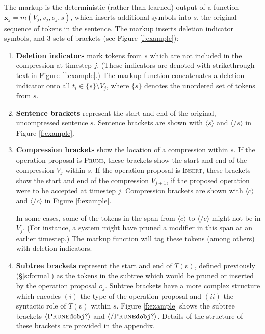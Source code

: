 \documentclass[11pt,a4paper]{article}
\begin{document}
The markup is the deterministic (rather than learned) output of a function $\bm{x}_j=m(V_j,v_j,o_j,s)$, which inserts additional symbols into $s$, the original sequence of tokens in the sentence. The markup inserts deletion indicator symbols, and 3 sets of brackets (see Figure \ref{f:example}): 

\begin{enumerate}
\item{\textbf{Deletion indicators} mark tokens from $s$ which are not included in the compression at timestep $j$. (These indicators are denoted with strikethrough text in Figure \ref{f:example}.) The markup function concatenates a deletion indicator onto all $t_i \in \{s\} \setminus V_j$, where $\{s\}$ denotes the unordered set of tokens from $s$.} 
\item{\textbf{Sentence brackets} represent the start and end of the original, uncompressed sentence $s$. Sentence brackets are shown with $\langle s \rangle$ and $\langle / s \rangle$ in Figure \ref{f:example}.}
\item{\textbf{Compression brackets} show the location of a compression within $s$. If the operation proposal is \textsc{Prune}, these brackets show the start and end of the compression $V_j$ within $s$. If the operation proposal is \textsc{Insert}, these brackets show the start and end of the compression $V_{j+1}$, if the proposed operation were to be accepted at timestep $j$. Compression brackets are shown with $\langle c \rangle$ and $\langle / c \rangle$ in Figure \ref{f:example}. 

In some cases, some of the tokens in the span from $\langle c \rangle$ to $\langle /c \rangle$ might not be in $V_j$. (For instance, a system might have pruned a modifier in this span at an earlier timestep.)  The markup function will tag these tokens (among others) with deletion indicators.}
\item{\textbf{Subtree brackets} represent the start and end of $T(v)$, defined previously (\S\ref{s:formal}) as the tokens in the subtree which would be pruned or inserted by the operation proposal $o_j$. Subtree brackets have a more complex structure which encodes $(i)$ the type of the operation proposal and $(ii)$ the syntactic role of $T(v)$ within $s$. Figure \ref{f:example} shows the subtree brackets $\langle \textsc{Prune} \texttt{dobj} ? \rangle$ and $\langle / \textsc{Prune} \texttt{dobj} ? \rangle$. Details of the structure of these brackets are provided in the appendix.}
\end{enumerate}
\end{document}
